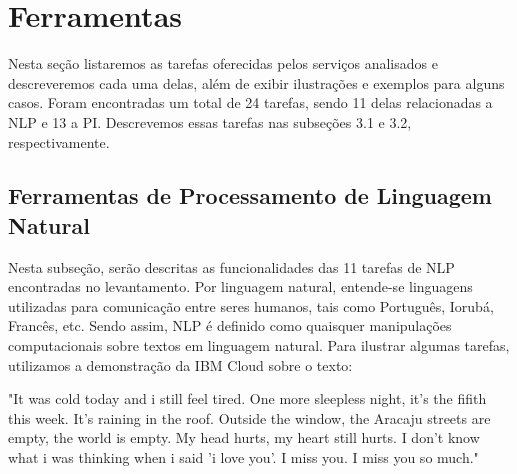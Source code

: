 \documentclass{article}
\begin{document}
\section{Ferramentas}
Nesta seção listaremos as tarefas oferecidas pelos serviços analisados e descreveremos cada uma delas, além de exibir ilustrações e exemplos para alguns casos. Foram encontradas um total de 24 tarefas, sendo 11 delas relacionadas a NLP e 13 a PI. Descrevemos essas tarefas nas subseções 3.1 e 3.2, respectivamente.

\subsection{Ferramentas de Processamento de Linguagem Natural}
Nesta subseção, serão descritas as funcionalidades das 11 tarefas de NLP encontradas no levantamento. Por linguagem natural, entende-se linguagens utilizadas para comunicação entre seres humanos, tais como Português, Iorubá, Francês, etc. Sendo assim, NLP é definido como quaisquer manipulações computacionais sobre textos em linguagem natural\cite{nltk}. Para ilustrar algumas tarefas, utilizamos a demonstração da IBM Cloud sobre o texto: 
\begin{myquote}
        "It was cold today and i still feel tired. One more sleepless night, it's the fifith this week. It's raining in the roof. Outside the window, the Aracaju streets are empty, the world is empty. My head hurts, my heart still hurts. I don't know what i was thinking when i said 'i love you'. I miss you. I miss you so much."
\end{myquote}
\end{document}
